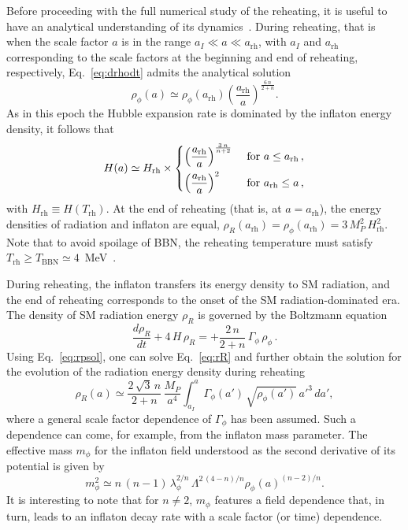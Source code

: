 \documentclass[a4paper,11pt]{article}
\newcommand{\rR}{\rho_R}
\newcommand{\rp}{\rho_\phi}
\newcommand{\Gp}{\Gamma_\phi}
\newcommand{\arh}{a_\text{rh}}
\newcommand{\Trh}{T_\text{rh}}
\newcommand{\Hrh}{H_\text{rh}}
\begin{document}
Before proceeding with the full numerical study of the reheating, it is useful to have an analytical understanding of its dynamics~\cite{Bernal:2022wck}.
During reheating, that is when the scale factor $a$ is in the range $a_I \ll a \ll \arh$, with $a_I$ and $\arh$ corresponding to the scale factors at the beginning and end of reheating, respectively, Eq.~\eqref{eq:drhodt} admits the analytical solution
\begin{equation} \label{eq:rpsol}
    \rp(a) \simeq \rp (\arh) \left(\frac{\arh}{a}\right)^\frac{6\, n}{2 + n}.
\end{equation}
As in this epoch the Hubble expansion rate is dominated by the inflaton energy density, it follows that
\begin{equation} \label{eq:Hubble}
    H(a) \simeq \Hrh \times
    \begin{dcases}
        \left(\frac{\arh}{a}\right)^\frac{3\, n}{n + 2} &\text{ for } a \leq \arh\,,\\
        \left(\frac{\arh}{a}\right)^2 &\text{ for } \arh \leq a\,,
    \end{dcases}
\end{equation}
with $\Hrh \equiv H(\Trh)$.
At the end of reheating (that is, at $a = \arh$), the energy densities of radiation and inflaton are equal, $\rR(\arh) = \rp(\arh) = 3\, M_P^2\, \Hrh^2$.
Note that to avoid spoilage of BBN, the reheating temperature must satisfy $\Trh \geq T_\text{BBN} \simeq 4$~MeV~\cite{Sarkar:1995dd, Kawasaki:2000en, Hannestad:2004px, DeBernardis:2008zz, deSalas:2015glj}.

During reheating, the inflaton transfers its energy density to SM radiation, and the end of reheating corresponds to the onset of the SM radiation-dominated era.
The density of SM radiation energy $\rR$ is governed by the Boltzmann equation
\begin{equation} \label{eq:rR}
    \frac{d\rR}{dt} + 4\, H\, \rR = + \frac{2\, n}{2 + n}\, \Gp\, \rp\,.
\end{equation}
Using Eq.~\eqref{eq:rpsol}, one can solve Eq.~\eqref{eq:rR} and further obtain the solution for the evolution of the radiation energy density during reheating 
\begin{equation} \label{eq:rR_int}
    \rR(a) \simeq \frac{2\, \sqrt{3}\, n}{2 + n}\, \frac{M_P}{a^4} \int_{a_I}^a \Gp(a')\, \sqrt{\rp(a')}\, a'^3\, da',
\end{equation}
where a general scale factor dependence of $\Gp$ has been assumed.
Such a dependence can come, for example, from the inflaton mass parameter.
The effective mass $m_\phi$ for the inflaton field understood as the second derivative of its potential is given by
\begin{equation} \label{eq:mass}
    m_\phi^2 \simeq n\, (n-1)\, \lambda_\phi^{2/n}\, \Lambda^{2\, (4 - n)/n} \rp(a)^{(n-2)/n}. 
\end{equation}
It is interesting to note that for $n \neq 2$, $m_\phi$ features a field dependence that, in turn, leads to an inflaton decay rate with a scale factor (or time) dependence.
\end{document}
